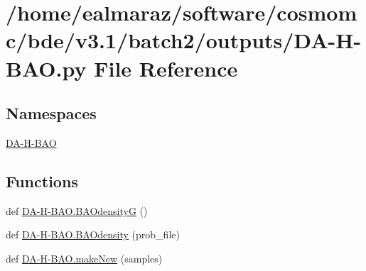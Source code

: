 \hypertarget{DA-H-BAO_8py}{}\section{/home/ealmaraz/software/cosmomc/bde/v3.1/batch2/outputs/\+D\+A-\/\+H-\/\+B\+AO.py File Reference}
\label{DA-H-BAO_8py}
\subsection*{Namespaces}
\begin{DoxyCompactItemize}
\item 
 \mbox{\hyperlink{namespaceDA-H-BAO}{D\+A-\/\+H-\/\+B\+AO}}
\end{DoxyCompactItemize}
\subsection*{Functions}
\begin{DoxyCompactItemize}
\item 
def \mbox{\hyperlink{namespaceDA-H-BAO_ad99c99db245ed920a8ce4610595df78f}{D\+A-\/\+H-\/\+B\+A\+O.\+B\+A\+OdensityG}} ()
\item 
def \mbox{\hyperlink{namespaceDA-H-BAO_aaf711c43bd7501db365be36cc65b28af}{D\+A-\/\+H-\/\+B\+A\+O.\+B\+A\+Odensity}} (prob\+\_\+file)
\item 
def \mbox{\hyperlink{namespaceDA-H-BAO_a7ed8e2c76c4e31a068d68d9dd816b08e}{D\+A-\/\+H-\/\+B\+A\+O.\+make\+New}} (samples)
\end{DoxyCompactItemize}
